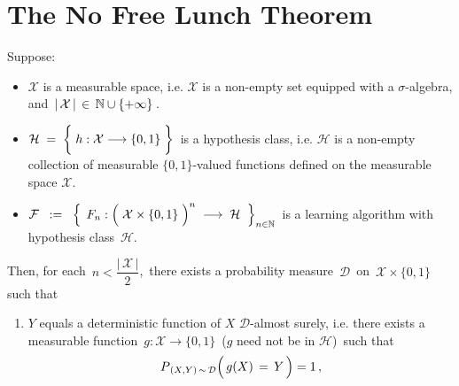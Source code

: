 

\section{The No Free Lunch Theorem}
\setcounter{theorem}{0}
\setcounter{equation}{0}


\renewcommand{\theenumi}{\roman{enumi}}
\renewcommand{\labelenumi}{\textnormal{(\theenumi)}$\;\;$}


\begin{theorem}
\label{Thm:NoFreeLunch}
\mbox{}\vskip 0.1cm
\noindent
Suppose:
\begin{itemize}
\item
	$\mathcal{X}$ is a measurable space, i.e. $\mathcal{X}$ is a non-empty set equipped with a $\sigma$-algebra,
	and \,$\vert\,\mathcal{X}\,\vert \,\in\, \mathbb{N}\cup\{+\infty\}$\,.
\item
	$\mathcal{H} \; = \; \left\{\; h : \mathcal{X} \overset{{\color{white}\vert}}{\longrightarrow} \{0,1\}\;\right\}$\,
	is a hypothesis class, i.e.
	$\mathcal{H}$ is a non-empty collection of measurable $\{0,1\}$-valued functions defined on the
	measurable space $\mathcal{X}$.
\item
	$\mathcal{F}
	\;\; : = \;\;
		\left\{\;\,
			F_{n} : \left(\;\mathcal{X} \overset{{\color{white}.}}{\times} \{0,1\} \;\right)^{n}
			\; \longrightarrow \;\mathcal{H}
			\;\;\right\}_{n\in\N}$\,
	is a learning algorithm with hypothesis class \,$\mathcal{H}$.
\end{itemize}
Then, for each \,$n < \dfrac{\vert\,\mathcal{X}\,\vert}{2}$,\,
there exists a probability measure \,$\mathcal{D}$\, on
\,$\mathcal{X} \times \{0,1\}$\,
such that
\begin{enumerate}
\item
	$Y$ equals a deterministic function of $X$ $\mathcal{D}$-almost surely, i.e. there exists a
	measurable function \,$g : \mathcal{X} \longrightarrow \{0,1\} $\, ($g$ need not be in $\mathcal{H}$)\,
	such that
	\begin{equation*}
	P_{\,(X,Y)\,\sim\,\mathcal{D}}\!\left(\,g(X) \,\overset{{\color{white}-}}{=}\, Y\,\right) = 1\,,

\end{equation*}
\end{enumerate}
\end{theorem}
